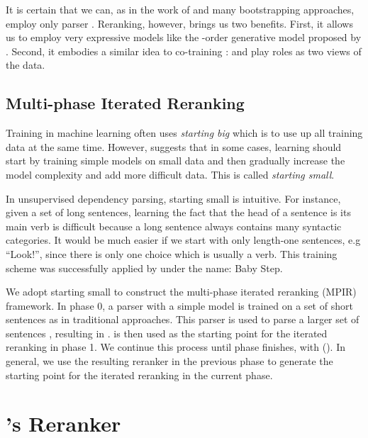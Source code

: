 \documentclass[11pt,letterpaper]{article}
\begin{document}
It is certain that we can, as in the work of 
 and many bootstrapping approaches, 
employ only parser . Reranking, however, brings us two benefits. 
First, it allows us to employ very expressive models like the -order 
generative model proposed by . Second, 
it embodies a similar idea to co-training
\cite{DBLP:conf/colt/BlumM98}:  and  play roles as two 
views of the data. 



\subsection{Multi-phase Iterated Reranking}



Training in machine learning often uses  
\textit{starting big} which is to use up all training data at 
the same time. However,  suggests 
that in some cases, learning should start by training simple 
models on small data and then gradually increase the model
complexity and add more difficult data. This is called 
\textit{starting small}. 

In unsupervised dependency parsing, starting small is 
intuitive. For instance, given a set of long sentences, learning 
the fact that the head of a sentence is its main verb is 
difficult because a long sentence always contains many syntactic 
categories. It would be much easier if we start with only length-one 
sentences, e.g ``Look!'', since there is only one choice which is 
usually a verb. This training scheme was successfully applied 
by  under the name: Baby Step.

We adopt starting small to construct the multi-phase iterated reranking 
(MPIR) framework.
In phase 0, a parser  with a simple model  is trained on 
a set of short sentences  as in traditional 
approaches. This parser is used to parse a larger set of sentences 
, resulting in 
.  is then used as 
the starting point for the iterated reranking in phase 1. 
We continue this process until phase  finishes, with 
 (). 
In general, we use the resulting reranker in the previous phase 
to generate the starting point for the iterated reranking in the 
current phase. 

\section{'s Reranker}
\label{section reranker}
\end{document}
